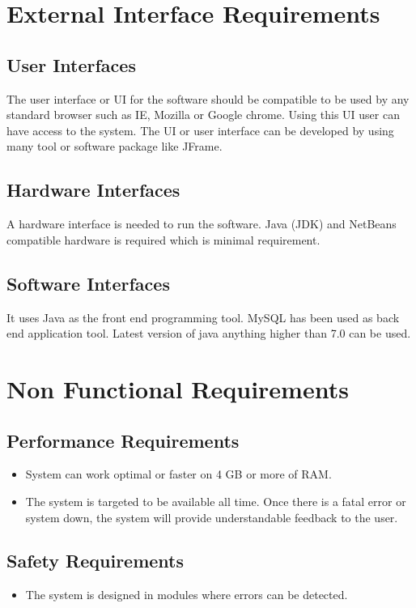 \documentclass[oneside,a4paper,12pt]{report}
\begin{document}
\section{External Interface Requirements}
\subsection{User Interfaces}
\hspace*{0.5cm} The user interface or UI for the software should be compatible to be used by any standard browser such as IE, Mozilla or Google chrome. Using this UI user can have access to the system. The UI or user interface can be developed  by using many tool or software package like JFrame.

\subsection{Hardware Interfaces}
\hspace*{0.5cm} A hardware interface is needed to run the software. Java (JDK) and NetBeans compatible hardware is required which is minimal requirement. 

\subsection{Software Interfaces}
\hspace*{0.5cm} It uses Java as the front end programming tool. MySQL has been used as  back end application tool. Latest version of java anything higher than 7.0 can be used. 

\section{Non Functional Requirements}
\subsection{Performance Requirements}
\begin{itemize}
\item System can work optimal or faster on 4 GB or more of RAM.
\item The system is targeted to be available all time. Once there is a fatal error or system down, the system will provide understandable feedback to the user.
\end{itemize}

\subsection{Safety Requirements}
\begin{itemize}
\item  The system is designed in modules where errors can be detected.
\end{itemize}
\end{document}
